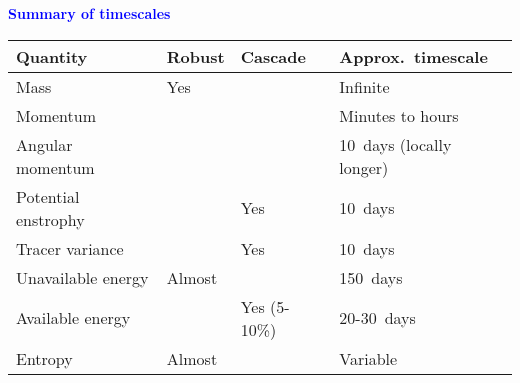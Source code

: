 \documentclass[a4]{seminar}
\newcommand{\B}[1]{\textcolor{blue}{#1}}
\begin{document}





















\begin{slide}


\B{\bf Summary of timescales}

\vspace{2mm}

\begin{tabular}{|l|l|l|l|}
\hline
Quantity    & Robust     & Cascade & Approx.\ timescale\\
\hline
\hline
Mass        & Yes        &         & Infinite \\  
\hline
Momentum    &            &         & Minutes to hours \\
Angular momentum &       &         & 10~days (locally longer) \\
\hline
Potential enstrophy &    & Yes     & 10~days \\
Tracer variance     &    & Yes     & 10~days \\
\hline
Unavailable energy & Almost &      & 150~days \\
Available energy   &     & Yes (5-10\%) & 20-30~days \\
\hline
Entropy      & Almost   &         & Variable \\
\hline
\end{tabular}




\end{slide}
\end{document}
